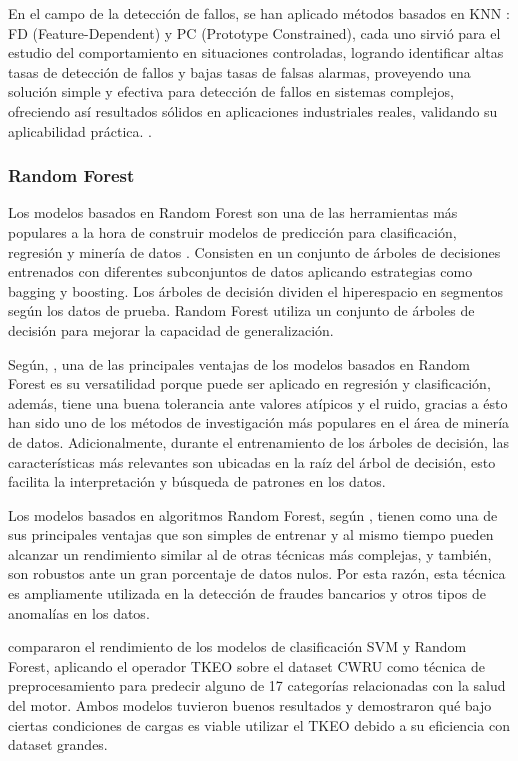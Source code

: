 \documentclass[11pt,a4paper,spanish]{book}
\numberwithin{equation}{chapter}
\numberwithin{figure}{chapter}
\begin{document}
En el campo de la detección de fallos, se han aplicado métodos basados en KNN : FD 
(Feature-Dependent) y PC (Prototype Constrained), cada uno sirvió para el estudio del 
comportamiento en situaciones controladas, logrando identificar altas tasas de detección 
de fallos y bajas tasas de falsas alarmas, proveyendo una solución simple y efectiva 
para detección de fallos en sistemas complejos, ofreciendo así resultados sólidos en 
aplicaciones industriales reales, validando su aplicabilidad práctica.
\cite{zhou2015faultdetection}.


\subsubsection{Random Forest}


Los modelos basados en Random Forest son una de las herramientas más populares a la 
hora de construir modelos de predicción para clasificación, regresión y minería de 
datos \cite{rushall2013rf}. Consisten en un conjunto de árboles de decisiones entrenados 
con diferentes subconjuntos de datos aplicando estrategias como bagging y boosting. 
Los árboles de decisión dividen el hiperespacio en segmentos según los datos de prueba. 
Random Forest utiliza un conjunto de árboles de decisión para mejorar la capacidad de 
generalización.  


Según, \cite{salman2024rf}, una de las principales ventajas de los modelos basados en 
Random Forest es su versatilidad porque puede ser aplicado en regresión y clasificación, 
además, tiene una buena tolerancia ante valores atípicos y el ruido, gracias a ésto han 
sido uno de los métodos de investigación más populares en el área de minería de datos. 
Adicionalmente, durante el entrenamiento de los árboles de decisión, las características 
más relevantes son ubicadas en la raíz del árbol de decisión, esto facilita la 
interpretación y búsqueda de patrones en los datos. 


Los modelos basados en algoritmos Random Forest, según \cite{canovas2017random}, tienen 
como una de sus principales ventajas que son simples de entrenar y al mismo tiempo 
pueden alcanzar un rendimiento similar al de otras técnicas más complejas, y también, 
son robustos ante un gran porcentaje de datos nulos. Por esta razón, esta técnica es 
ampliamente utilizada en la detección de fraudes bancarios y otros tipos de anomalías 
en los datos. 


\cite{yu2025tkeo} compararon el rendimiento de los modelos de clasificación SVM  y 
Random Forest, aplicando el operador TKEO sobre el dataset CWRU como técnica de 
preprocesamiento para predecir alguno de 17 categorías relacionadas con la salud del 
motor. Ambos modelos tuvieron buenos resultados y demostraron qué bajo ciertas 
condiciones de cargas es viable utilizar el TKEO debido a su eficiencia con dataset 
grandes.
\end{document}
